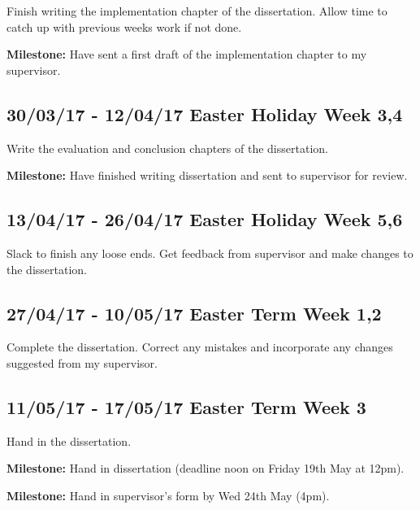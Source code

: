 \documentclass[12pt,a4paper,twoside]{article}
\begin{document}
      Finish writing the implementation chapter of the dissertation.
      Allow time to catch up with previous weeks work if not done.

     \textbf{Milestone:} Have sent a first draft of the implementation chapter to my supervisor.

    \subsection*{30/03/17 - 12/04/17 \hfill Easter Holiday Week 3,4}

      Write the evaluation and conclusion chapters of the dissertation.

      \textbf{Milestone:} Have finished writing dissertation and sent to supervisor for review.


    \subsection*{13/04/17 - 26/04/17 \hfill Easter Holiday Week 5,6}

      Slack to finish any loose ends. Get feedback from supervisor and make changes to the dissertation.


    \subsection*{27/04/17 - 10/05/17 \hfill Easter Term Week 1,2}

      Complete the dissertation. Correct any mistakes and incorporate any changes suggested from my supervisor.


    \subsection*{11/05/17 - 17/05/17 \hfill Easter Term Week 3}
      Hand in the dissertation.

     \textbf{Milestone:} Hand in dissertation (deadline noon on Friday 19th May at 12pm).

     \textbf{Milestone:} Hand in supervisor's form by Wed 24th May (4pm).

     \printbibliography
\end{document}
